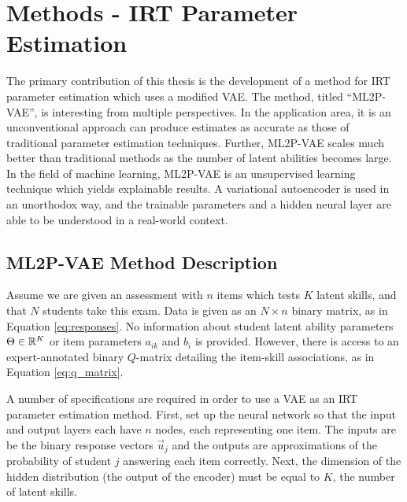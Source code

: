 \chapter{Methods - IRT Parameter Estimation}
The primary contribution of this thesis is the development of a method for IRT parameter estimation which uses a modified VAE. The method, titled ``ML2P-VAE'', is interesting from multiple perspectives. In the application area, it is an unconventional approach can produce estimates as accurate as those of traditional parameter estimation techniques. Further, ML2P-VAE scales much better than traditional methods as the number of latent abilities becomes large. In the field of machine learning, ML2P-VAE is an unsupervised learning technique which yields explainable results. A variational autoencoder is used in an unorthodox way, and the trainable parameters and a hidden neural layer are able to be understood in a real-world context.

\section{ML2P-VAE Method Description}
Assume we are given an assessment with $n$ items which tests $K$ latent skills, and that $N$ students take this exam. Data is given as an $N \times n$ binary matrix, as in Equation \ref{eq:responses}. No information about student latent ability parameters $\Theta \in \mathbb{R}^K$ or item parameters $a_{ik}$ and $b_i$ is provided. However, there is access to an expert-annotated binary $Q$-matrix detailing the item-skill associations, as in Equation \ref{eq:q_matrix}.

A number of specifications are required in order to use a VAE as an IRT parameter estimation method. First, set up the neural network so that the input and output layers each have $n$ nodes, each representing one item. The inputs are be the binary response vectors $\vec u_j$ and the outputs are approximations of the probability of student $j$ answering each item correctly. Next, the dimension of the hidden distribution (the output of the encoder) must be equal to $K$, the number of latent skills.

